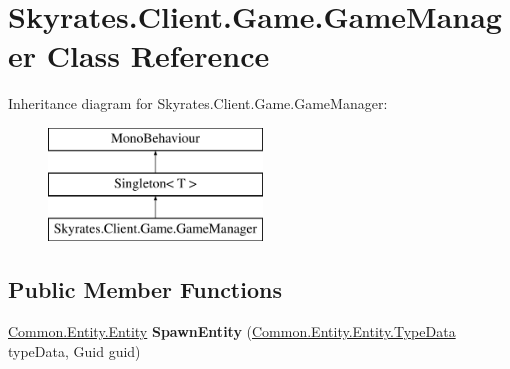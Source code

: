 \hypertarget{class_skyrates_1_1_client_1_1_game_1_1_game_manager}{\section{Skyrates.\-Client.\-Game.\-Game\-Manager Class Reference}
\label{class_skyrates_1_1_client_1_1_game_1_1_game_manager}
}
Inheritance diagram for Skyrates.\-Client.\-Game.\-Game\-Manager\-:\begin{figure}[H]
\begin{center}
\leavevmode
\includegraphics[height=3.000000cm]{class_skyrates_1_1_client_1_1_game_1_1_game_manager}
\end{center}
\end{figure}
\subsection*{Public Member Functions}
\begin{DoxyCompactItemize}
\item 
\hypertarget{class_skyrates_1_1_client_1_1_game_1_1_game_manager_a893f619e6b00db10a0cc40ade9ffd325}{\hyperlink{class_skyrates_1_1_common_1_1_entity_1_1_entity}{Common.\-Entity.\-Entity} {\bfseries Spawn\-Entity} (\hyperlink{class_skyrates_1_1_common_1_1_entity_1_1_entity_1_1_type_data}{Common.\-Entity.\-Entity.\-Type\-Data} type\-Data, Guid guid)}\label{class_skyrates_1_1_client_1_1_game_1_1_game_manager_a893f619e6b00db10a0cc40ade9ffd325}

\end{DoxyCompactItemize}
